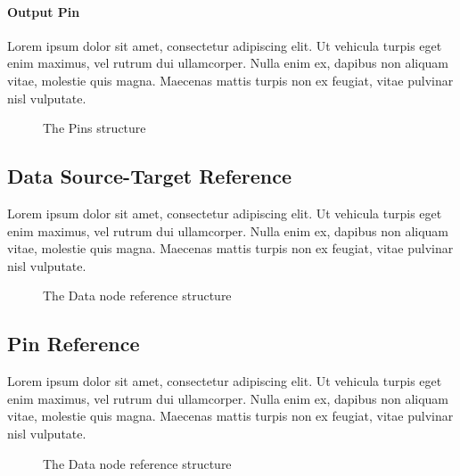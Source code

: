 \paragraph{Output Pin}

Lorem ipsum dolor sit amet, consectetur adipiscing elit. Ut vehicula turpis eget enim maximus, vel rutrum dui ullamcorper. Nulla enim ex, dapibus non aliquam vitae, molestie quis magna. Maecenas mattis turpis non ex feugiat, vitae pulvinar nisl vulputate.

\begin{figure}[!ht]
\centering

\caption{The Pins structure}
\label{fig:pins}
\end{figure}

\subsection{Data Source-Target Reference}

Lorem ipsum dolor sit amet, consectetur adipiscing elit. Ut vehicula turpis eget enim maximus, vel rutrum dui ullamcorper. Nulla enim ex, dapibus non aliquam vitae, molestie quis magna. Maecenas mattis turpis non ex feugiat, vitae pulvinar nisl vulputate.

\begin{figure}[!ht]
	\centering
	
	\caption{The Data node reference structure}
	\label{fig:data_source_target_reference}
\end{figure}

\subsection{Pin Reference}

Lorem ipsum dolor sit amet, consectetur adipiscing elit. Ut vehicula turpis eget enim maximus, vel rutrum dui ullamcorper. Nulla enim ex, dapibus non aliquam vitae, molestie quis magna. Maecenas mattis turpis non ex feugiat, vitae pulvinar nisl vulputate.

\begin{figure}[!ht]
	\centering
	
	\caption{The Data node reference structure}
	\label{fig:pin_reference}
\end{figure}
